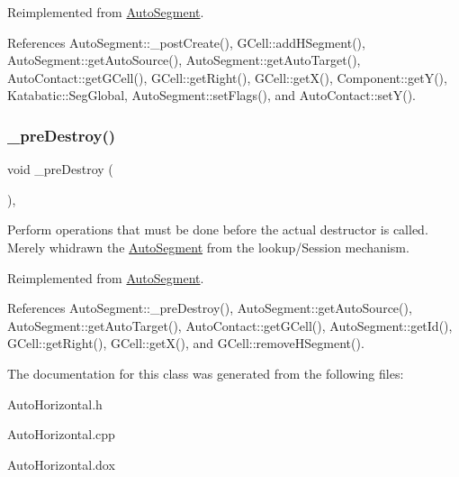 Reimplemented from \mbox{\hyperlink{classKatabatic_1_1AutoSegment_a3715b38135ca24745f610bebd3407c10}{Auto\+Segment}}.



References Auto\+Segment\+::\+\_\+post\+Create(), G\+Cell\+::add\+H\+Segment(), Auto\+Segment\+::get\+Auto\+Source(), Auto\+Segment\+::get\+Auto\+Target(), Auto\+Contact\+::get\+G\+Cell(), G\+Cell\+::get\+Right(), G\+Cell\+::get\+X(), Component\+::get\+Y(), Katabatic\+::\+Seg\+Global, Auto\+Segment\+::set\+Flags(), and Auto\+Contact\+::set\+Y().

\mbox{\label{classKatabatic_1_1AutoHorizontal_a7c13d9795eafd477994961f8a0d962d0}} 
\subsubsection{\texorpdfstring{\+\_\+pre\+Destroy()}{\_preDestroy()}}
{\footnotesize\ttfamily void \+\_\+pre\+Destroy (\begin{DoxyParamCaption}{ }\end{DoxyParamCaption})\hspace{0.3cm}{\ttfamily [protected]}, {\ttfamily [virtual]}}

Perform operations that must be done before the actual destructor is called. Merely whidrawn the \mbox{\hyperlink{classKatabatic_1_1AutoSegment}{Auto\+Segment}} from the lookup/\+Session mechanism. 

Reimplemented from \mbox{\hyperlink{classKatabatic_1_1AutoSegment_a7c13d9795eafd477994961f8a0d962d0}{Auto\+Segment}}.



References Auto\+Segment\+::\+\_\+pre\+Destroy(), Auto\+Segment\+::get\+Auto\+Source(), Auto\+Segment\+::get\+Auto\+Target(), Auto\+Contact\+::get\+G\+Cell(), Auto\+Segment\+::get\+Id(), G\+Cell\+::get\+Right(), G\+Cell\+::get\+X(), and G\+Cell\+::remove\+H\+Segment().



The documentation for this class was generated from the following files\+:\begin{DoxyCompactItemize}
\item 
Auto\+Horizontal.\+h\item 
Auto\+Horizontal.\+cpp\item 
Auto\+Horizontal.\+dox\end{DoxyCompactItemize}
